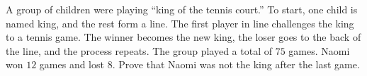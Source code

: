 A group of children were playing ``king of the tennis court.'' To start, one child is named king, and the rest form a line. The first player in line challenges the king to a tennis game. The winner becomes the new king, the loser goes to the back of the line, and the process repeats. The group played a total of $75$ games. Naomi won $12$ games and lost $8$. Prove that Naomi was not the king after the last game.
